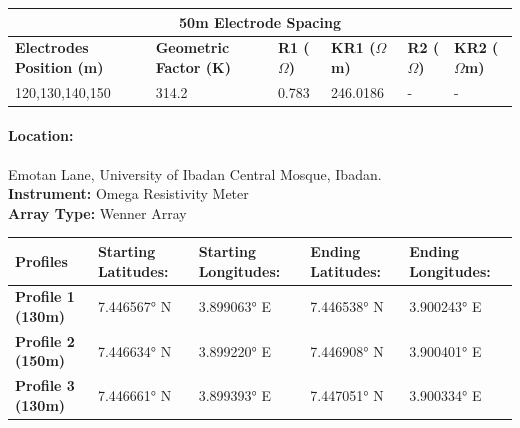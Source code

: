 \documentclass[12pt,a4paper]{report}
\begin{document}
\begin{itemize}
\begin{table}[h!]
    \centering
    \begin{adjustbox}{max width=\textwidth}
    \setlength{\tabcolsep}{15pt}
    \renewcommand{\arraystretch}{1.5}
    \begin{tabular}{|p{3.0cm}|p{2.5cm}|p{1.8cm}|p{2.5cm}|p{2cm}|p{3.0cm}|}
    \hline
    \multicolumn{6}{|c|}{\rule{0pt}{2em}\huge\textbf{50m Electrode Spacing}} \\
    \hline
    \textbf{Electrodes Position (m)} & \textbf{Geometric Factor (K)} & \textbf{R1 ($\Omega$)} & \textbf{KR1 ($\Omega$m)} & \textbf{R2 ($\Omega$)} & \textbf{KR2 ($\Omega$m)}  \\ \hline
    120,130,140,150 & 314.2 & 0.783 & 246.0186 & - & - \\ \hline
    \end{tabular}
\end{adjustbox}
\end{table}

\paragraph{\textbf{Location:}} {Emotan Lane, University of Ibadan Central Mosque, Ibadan.} \\
\textbf{Instrument:} {Omega Resistivity Meter} \\
\textbf{Array Type:} {Wenner Array}

\begin{table}[H]
    \begin{adjustbox}{max width=\textwidth}
    \renewcommand{\arraystretch}{1.5}
    \begin{tabular}{|p{3.3cm}|p{2.4cm}|p{2.4cm}|p{2.4cm}|p{2.4cm}|}
    \hline
    \textbf{Profiles} &  
    \textbf{Starting Latitudes:} & 
    \textbf{Starting Longitudes:} & 
    \textbf{Ending Latitudes:} &
    \textbf{Ending Longitudes:} \\
    \hline
    \textbf{Profile 1 (130m)} & 7.446567° N & 3.899063° E & 7.446538° N & 3.900243° E  \\ \hline
    \textbf{Profile 2 (150m)} & 7.446634° N & 3.899220° E & 7.446908° N & 3.900401° E  \\ \hline
    \textbf{Profile 3 (130m)} & 7.446661° N & 3.899393° E & 7.447051° N & 3.900334° E  \\ \hline
    \end{tabular}
    \end{adjustbox}
    \label{tab:UI Mosque CST Coordinates: 1-10}
\end{table}


\end{itemize}
\end{document}
